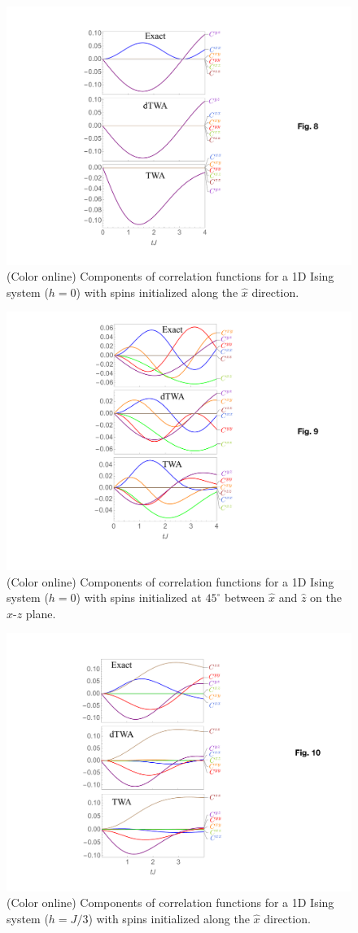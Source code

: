 \documentclass[pra,reprint,superscriptaddress]{revtex4-1}
\begin{document}

\begin{figure}[h]\centering
 \includegraphics[width = 0.8\columnwidth]{fig8.pdf}
 \caption{(Color online) Components of correlation functions for a 1D Ising system ($h=0$) with spins initialized along the $\hat{x}$ direction.}
 \label{appendix1}
\end{figure}
\begin{figure}[t]\centering
 \includegraphics[width = 0.8\columnwidth]{fig9.pdf}
 \caption{(Color online) Components of correlation functions for a 1D Ising system ($h=0$) with spins initialized at $45^\circ$ between $\hat{x}$ and $\hat{z}$ on the $x$-$z$ plane.}
 \label{appendix2}
\end{figure}
\begin{figure}[t!]\centering
 \includegraphics[width = 0.8\columnwidth]{fig10.pdf}
 \caption{(Color online) Components of correlation functions for a 1D Ising system ($h=J/3$) with spins initialized along the $\hat{x}$ direction.}
 \label{appendix3}
\end{figure}
\end{document}
